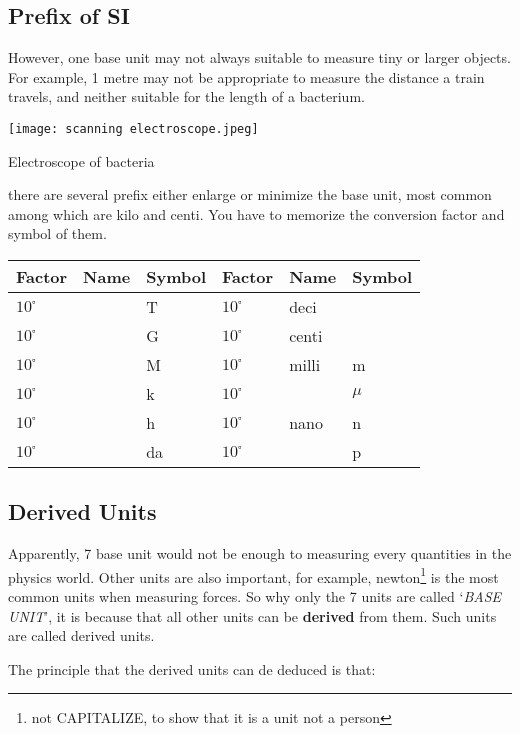 \documentclass[12pt,a4paper]{tufte-handout}
\begin{document}
\subsection*{Prefix of SI}
However, one base unit may not always suitable to measure tiny or larger objects. For example, 1 metre may not be appropriate to measure the distance a train travels, and neither suitable for the length of a bacterium.
\begin{marginfigure}
	\texttt{[image: scanning electroscope.jpeg]}
	\caption{Electroscope of bacteria}
\end{marginfigure}
there are several prefix either enlarge or minimize the base unit, most common among which are kilo and centi.
You have to memorize the conversion factor and symbol of them.
\begin{table}[H]
\centering
\begin{tabular}{|l|l|l|l|l|l|}
\hline
Factor    & Name  & Symbol & Factor    & Name  & Symbol \\ \hline
$10^{\square}$ &   & T      & $10^{\square}$ & deci  &       \\ \hline
$10^{\square}$    &   & G      & $10^{\square}$ & centi &       \\ \hline
$10^{\square}$    &   & M      & $10^{\square}$ & milli & m      \\ \hline
$10^{\square}$    &   & k      & $10^{\square}$ &  & $\mu$   \\ \hline
$10^{\square}$    &  & h      & $10^{\square}$ & nano  & n      \\ \hline
$10^{\square}$ &   & da     & $10^{\square}$ &   & p      \\ \hline
\end{tabular}
\end{table}


\subsection*{Derived Units}
Apparently, 7 base unit would not be enough to measuring every quantities in the physics world. Other units are also important, for example, newton\footnote{not CAPITALIZE, to show that it is a unit not a person} is the most common units when measuring forces. So why only the 7 units are called `\emph{BASE UNIT}', it is because that all other units can be \textbf{derived} from them. Such units are called derived units.

The principle that the derived units can de deduced is that:\\
\uline{\hspace{5 in}}
\end{document}
